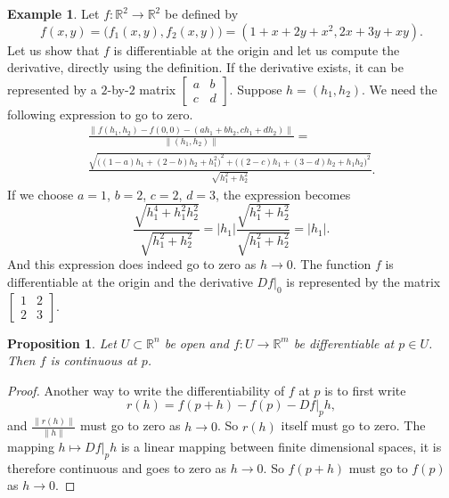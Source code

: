 \documentclass[12pt,openany]{book}
\newcommand{\sabs}[1]{\lvert {#1} \rvert}
\newcommand{\snorm}[1]{\lVert {#1} \rVert}
\newcommand{\R}{{\mathbb{R}}}
\theoremstyle{plain}
\newtheorem{prop}[thm]{Proposition}
\theoremstyle{remark}
\theoremstyle{definition}
\theoremstyle{exercise}
\theoremstyle{example}
\newtheorem{example}[thm]{Example}
\begin{document}
\begin{example}
Let $f \colon \R^2 \to \R^2$ be defined by
\begin{equation*}
f(x,y) = \bigl(f_1(x,y),f_2(x,y)\bigr) = (1+x+2y+x^2,2x+3y+xy).
\end{equation*}
Let us show that $f$ is differentiable at the origin and let us 
compute the derivative,
directly using the definition.  If the
derivative exists, it can be
represented by a $2$-by-$2$ matrix
$\left[\begin{smallmatrix}a&b\\c&d\end{smallmatrix}\right]$.  Suppose $h =
(h_1,h_2)$.  We need the following expression to go to zero.
\begin{multline*}
\frac{\snorm{
f(h_1,h_2)-f(0,0)
-
(ah_1 +bh_2 , ch_1+dh_2)}
}{\snorm{(h_1,h_2)}}
=
\\
\frac{\sqrt{
{\bigl((1-a)h_1 + (2-b)h_2 + h_1^2\bigr)}^2
+
{\bigl((2-c)h_1 + (3-d)h_2 + h_1h_2\bigr)}^2}}{\sqrt{h_1^2+h_2^2}} .
\end{multline*}
If we choose $a=1$, $b=2$, $c=2$, $d=3$, the expression becomes
\begin{equation*}
\frac{\sqrt{
h_1^4 + h_1^2h_2^2}}{\sqrt{h_1^2+h_2^2}}
=
\sabs{h_1}
\frac{\sqrt{
h_1^2 + h_2^2}}{\sqrt{h_1^2+h_2^2}}
= \sabs{h_1} .
\end{equation*}
And this expression does indeed go to zero as $h \to 0$.  The
function $f$ is differentiable at the origin and 
the derivative $Df|_0$ is represented by the matrix
$\left[\begin{smallmatrix}1&2\\2&3\end{smallmatrix}\right]$.
\end{example}

\begin{prop}
Let $U \subset \R^n$ be open and $f \colon U \to \R^m$ be
differentiable at $p \in U$.  Then $f$ is continuous at $p$.
\end{prop}

\begin{proof}
Another way to write the differentiability of $f$ at $p$ is to first write
\begin{equation*}
r(h) = f(p+h)-f(p) - Df|_p h ,
\end{equation*}
and $\frac{\snorm{r(h)}}{\snorm{h}}$ must go to zero as $h \to 0$.
So
$r(h)$ itself must go to zero.  The mapping $h \mapsto Df|_p h$
is a linear mapping between finite dimensional spaces, it is
therefore continuous
and goes to zero as $h \to 0$.  So
$f(p+h)$ must go to $f(p)$ as $h \to 0$.
\end{proof}
\end{document}
